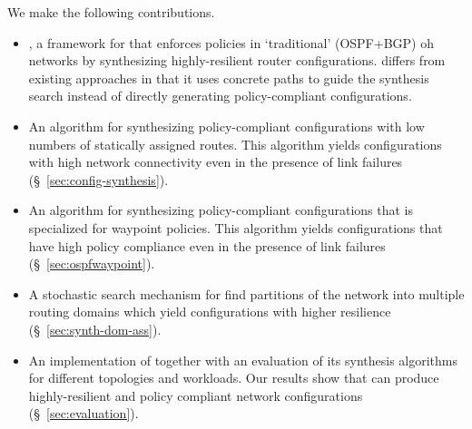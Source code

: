  We make the following contributions.
\begin{itemize}	
    \item \name, a framework for
	that enforces policies in `traditional' (OSPF+BGP) oh networks
	by synthesizing highly-resilient router configurations. 		
	\name differs from existing approaches in that it uses concrete
	paths to guide the synthesis search instead of directly generating policy-compliant
	configurations.

	\item An algorithm for synthesizing policy-compliant 		
		 configurations  with low 
		numbers
		of statically assigned routes. This algorithm yields configurations with
		high network connectivity even in the presence of link failures 
		(\S~\ref{sec:config-synthesis}). 

	\item An algorithm for synthesizing policy-compliant 		
		 configurations that is specialized for waypoint policies. 
		 This algorithm yields configurations that have
		 high policy compliance even in the presence of link failures (\S~\ref{sec:ospfwaypoint}). 
	
	\item A stochastic search mechanism for find 
		partitions of the network into multiple routing domains which
		yield configurations with higher resilience (\S~\ref{sec:synth-dom-ass}).
	
	\item An implementation of \name
	together with an evaluation of its synthesis algorithms
	 for different topologies and workloads. 
	 Our results show that \name can produce highly-resilient and policy compliant
	 network configurations (\S~\ref{sec:evaluation}). 
\end{itemize}
